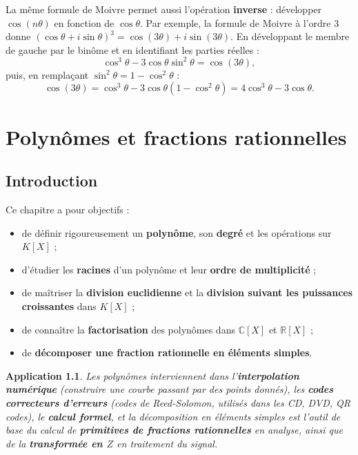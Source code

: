 \documentclass[a4paper,12pt,openany]{book}
\newtheorem{application}{Application}[section]
\begin{document}
\begin{remarque}
La même formule de Moivre permet aussi l'opération \textbf{inverse} :
développer $\cos(n\theta)$ en fonction de $\cos\theta$. Par exemple, la
formule de Moivre à l'ordre $3$ donne $(\cos\theta+i\sin\theta)^3 =
\cos(3\theta)+i\sin(3\theta)$. En développant le membre de gauche par le
binôme et en identifiant les parties réelles :
\[
\cos^3\theta - 3\cos\theta\sin^2\theta = \cos(3\theta),
\]
puis, en remplaçant $\sin^2\theta=1-\cos^2\theta$ :
\[
\cos(3\theta) = \cos^3\theta - 3\cos\theta(1-\cos^2\theta) = 4\cos^3\theta
- 3\cos\theta.
\]
\end{remarque}


\chapter{Polynômes et fractions rationnelles}

\section{Introduction}


Ce chapitre a pour objectifs :
\begin{itemize}
  \item de définir rigoureusement un \textbf{polynôme}, son \textbf{degré}
  et les opérations sur $K[X]$ ;
  \item d'étudier les \textbf{racines} d'un polynôme et leur \textbf{ordre
  de multiplicité} ;
  \item de maîtriser la \textbf{division euclidienne} et la \textbf{division
  suivant les puissances croissantes} dans $K[X]$ ;
  \item de connaître la \textbf{factorisation} des polynômes dans
  $\mathbb{C}[X]$ et $\mathbb{R}[X]$ ;
  \item de \textbf{décomposer une fraction rationnelle en éléments
  simples}.
\end{itemize}

\begin{application}
Les polynômes interviennent dans l'\textbf{interpolation numérique}
(construire une courbe passant par des points donnés), les
\textbf{codes correcteurs d'erreurs} (codes de Reed-Solomon, utilisés dans
les CD, DVD, QR codes), le \textbf{calcul formel}, et la décomposition en
éléments simples est l'outil de base du calcul de \textbf{primitives de
fractions rationnelles} en analyse, ainsi que de la \textbf{transformée en
$Z$} en traitement du signal.
\end{application}
\end{document}
